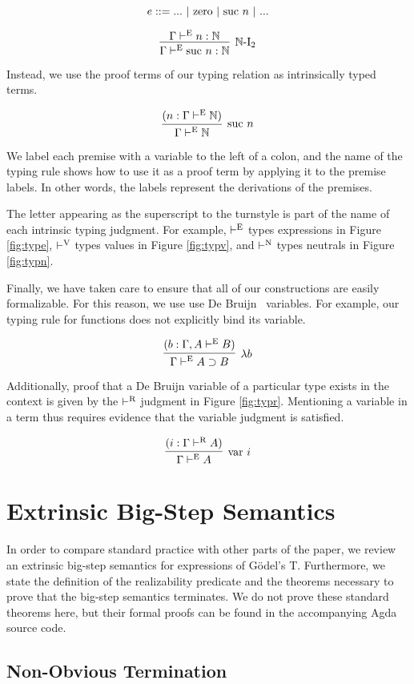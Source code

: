 \documentclass[preprint,nonatbib]{sigplanconf}
\numberwithin{subdefin}{defin}
\theoremstyle{definition}
\numberwithin{subtheorem}{theorem}
\numberwithin{sublemma}{theorem}
\numberwithin{corollary}{theorem}
\numberwithin{case}{theorem}
\numberwithin{slcase}{sublemma}
\numberwithin{scase}{subtheorem}
\numberwithin{lcase}{lemma}
\newcommand{\reffig}[1]{Figure \ref{fig:#1}}
\def\arr{\supset}
\def\lam{\lambda}
\def\nat{\mathbb{N}}
\newcommand{\turn}[1]{\vdash^\con{#1}}
\newcommand{\con}[1]{\textmd{#1}}
\newcommand{\fun}[1]{\textmd{#1}}
\newcommand{\type}[1]{\Gamma \turn{E} #1}
\newcommand{\ctype}[2]{\Gamma , #1 \turn{E} #2}
\newcommand{\typr}[1]{\Gamma \turn{R} #1}
\begin{document}
$$
e ::= ... ~ | ~ \con{zero} ~ | ~ \con{suc} ~ n ~ | ~ ...
$$

$$
\infer
  [\nat\con{-I}_2]
  {\Gamma \turn{E} \con{suc} ~ n : \nat}
{
  \Gamma \turn{E} n : \nat
}
$$

Instead, we use the proof terms of our typing relation as
intrinsically typed terms.

$$
\infer
  [\con{suc} ~ n]
  {\type{\nat}}
{
  (n : \type{\nat})
}
$$

We label each premise with a variable to
the left of a colon, and the name of the typing rule shows how to use
it as a proof term by applying it to the premise labels. In other
words, the labels represent the derivations of the premises.

The letter appearing as the superscript to the turnstyle is part of
the name of each intrinsic typing judgment. For example, $\turn{E}$
types expressions in \reffig{type}, $\turn{V}$ types values in
\reffig{typv}, and $\turn{N}$ types neutrals in \reffig{typn}.

Finally, we have taken care to ensure that all of our constructions
are easily formalizable. For this reason, we
use use De Bruijn~\cite{TODO} variables. For example, our typing rule
for functions does not explicitly bind its variable.

$$
\infer
  [\lam b]
  {\type{A \arr B}}
{
  (b : \ctype{A}{B})
}
$$

Additionally, proof that a De Bruijn variable of a particular type
exists in the context is given by the $\turn{R}$ judgment in
\reffig{typr}. Mentioning a variable in a term thus requires evidence
that the variable judgment is satisfied.

$$
\infer
  [\fun{var} ~ i]
  {\type{A}}
{
  (i : \typr{A})
}
$$

\section{Extrinsic Big-Step Semantics}
\label{sec:epred}

In order to compare standard practice with other parts of the paper,
we review an extrinsic big-step semantics for expressions of
G{\"o}del's T. Furthermore, we state the definition of the
realizability predicate and the theorems necessary to prove
that the big-step semantics terminates. We do not prove these standard
theorems here, but their formal proofs can be found in the
accompanying Agda source code. 

\subsection{Non-Obvious Termination}
\end{document}
